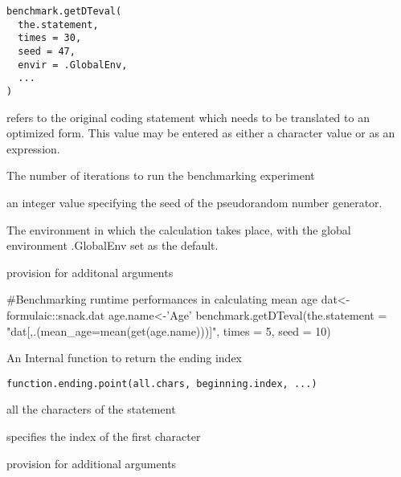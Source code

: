 \documentclass[a4paper]{book}
\begin{document}
%
\begin{Usage}
\begin{verbatim}
benchmark.getDTeval(
  the.statement,
  times = 30,
  seed = 47,
  envir = .GlobalEnv,
  ...
)
\end{verbatim}
\end{Usage}
%
\begin{Arguments}
\begin{ldescription}
\item[\code{the.statement}] refers to the original coding statement which needs to be translated to an optimized form.  This value may be entered as either a character value or as an expression.

\item[\code{times}] The number of iterations to run the benchmarking experiment

\item[\code{seed}] an integer value specifying the seed of the pseudorandom number generator.

\item[\code{envir}] The environment in which the calculation takes place, with the global environment .GlobalEnv set as the default.

\item[\code{...}] provision for additonal arguments
\end{ldescription}
\end{Arguments}
%
\begin{Examples}
\begin{ExampleCode}
#Benchmarking runtime performances in calculating mean age
dat<-formulaic::snack.dat
age.name<-'Age'
benchmark.getDTeval(the.statement = "dat[,.(mean_age=mean(get(age.name)))]", times = 5,  seed = 10)
\end{ExampleCode}
\end{Examples}
%
\begin{Description}\relax
An Internal function to return the ending index
\end{Description}
%
\begin{Usage}
\begin{verbatim}
function.ending.point(all.chars, beginning.index, ...)
\end{verbatim}
\end{Usage}
%
\begin{Arguments}
\begin{ldescription}
\item[\code{all.chars}] all the characters of the statement

\item[\code{beginning.index}] specifies the index of the first character

\item[\code{...}] provision for additional arguments
\end{ldescription}
\end{Arguments}
\end{document}
